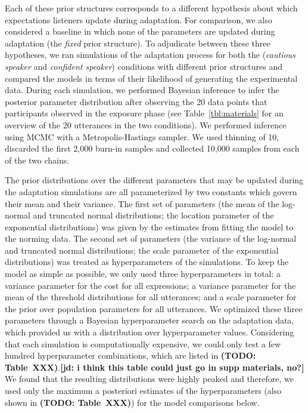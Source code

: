 \documentclass[lucida,biblatex]{sp} %
\newcommand{\jd}[1]{\textcolor{PinkyPurple}{\textbf{[jd: #1]}}}
\newcommand{\todo}[1]{}
\renewcommand{\todo}[1]{{\bf \color{red} (TODO: {#1})}}
\begin{document}
Each of these prior structures corresponds to a different hypothesis about which expectations listeners update during adaptation. For comparison, we also considered a baseline in which none of the parameters are updated during adaptation (the {\it fixed} prior structure). To adjudicate between these three hypotheses, we ran simulations of the adaptation process for both the (\textit{cautious speaker} and \textit{confident speaker}) conditions with different prior structures and compared the models in terms of their likelihood of generating the experimental data. During each simulation, we performed Bayesian inference to infer the posterior parameter distribution after observing the 20 data points that participants observed in the exposure phase (see Table~\ref{tbl:materials} for an overview of the 20 utterances in the two conditions). We performed inference using MCMC with a Metropolis-Hastings sampler. We used thinning of 10, discarded the first 2,000 burn-in samples and collected 10,000 samples from each of the two chains.

The prior distributions over the different parameters that may be updated during the adaptation simulations are all parameterized by two constants which govern their mean and their variance. The first set of parameters (the mean of the log-normal and truncated normal distributions; the location parameter of the exponential distributions) was given by the estimates from fitting the model to the norming data. The second set of parameters (the variance of the log-normal and truncated normal distributions; the scale parameter of the exponential distributions) was treated as hyperparameters of the simulations. To keep the model as simple as possible, we only used three hyperparameters in total: a variance parameter for the cost for all expressions; a variance parameter for the mean of the threshold distributions for all utterances; and a scale parameter for the prior over population parameters for all utterances. We optimized these three parameters through a Bayesian hyperparameter search on the adaptation data, which provided us with a distribution over hyperparameter values. Considering that each simulation is computationally expensive, we could only test a few hundred hyperparameter combinations, which are listed in \todo{Table~XXX}.\jd{i think this table could just go in supp materials, no?} We found that the resulting distributions were highly peaked and therefore, we used only the maximum a posteriori estimates of the hyperparameters (also shown in \todo{Table~XXX}) for the model comparisons below.
\end{document}
